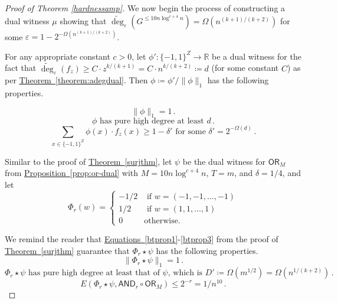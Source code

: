 \documentclass[11pt]{article}
\numberwithin{equation}{section}
\theoremstyle{definition}
\theoremstyle{plain}
\newcommand{\R}{\mathbb R}
\newcommand{\expref}[2]{\hyperref[#2]{#1~\ref{#2}}}
\newcommand{\expeqref}[2]{\hyperref[#2]{#1~\eqref{#2}}}
\newcommand{\OR}{\mathsf{ OR}}
\newcommand{\bits}{\{-1,1\}}
\newcommand{\ls}{\star}
\newcommand{\eps}{\varepsilon}
\newcommand{\adeg}{\widetilde{\operatorname{deg}}}
\newcommand{\AND}{\mathsf{AND}}
\begin{document}
\begin{proof}[Proof of Theorem \ref{hardnessamp}]
	
	\medskip
	We now begin the process of constructing a dual witness $\mu$ showing that $\adeg_{\eps}(G^{\leq 10 n \log^{c + 4} n})=\Omega\left(n^{(k+1)/(k+2)}\right)$
	for some $\eps=1-2^{-\Omega\left(n^{(k+1)/(k+2)}\right)}$.
	
	For any appropriate constant $c > 0$, let $\phi' \colon \bits^Z \to \R$ be a dual witness for the fact that $\adeg_{\eps}(f_z) \geq C \cdot z^{k/(k+1)} = C \cdot n^{k/(k+2)}\coloneqq d$ (for some constant $C$) as per \expref{Theorem}{theorem:adegdual}.
	Then $\phi \coloneqq  \phi'/\|\phi\|_1$ has the following properties. %
	
	\begin{equation}
	\label{phiprop1}
	\|\phi\|_1 =1\,.
	\end{equation}
	\begin{equation}
	\label{phiprop2}
	\phi \text{ has pure high degree at least } d\,.
	\end{equation}
	\begin{equation}
	\label{phiprop3}
	\sum_{x\in\bits^Z} \phi(x) \cdot f_z(x) \geq 1-\delta' \text{ for some } \delta'=2^{-\Omega(d)}\,.
	\end{equation}
	
	Similar to the proof of \expref{Theorem}{surjthm}, let $\psi$ be the dual witness for $\OR_M$ from \expref{Proposition}{prop:or-dual} with $M=10n\log^{c+4}n$, $T = m$, and $\delta=1/4$,
	and let 
	$$\Phi_r(w) = \begin{cases}
	-1/2 & \text{ if } w=(-1, -1, \dots, -1)\\
	1/2 & \text{ if } w= (1, 1, \dots, 1)\\
	0 & \text{otherwise}.
	\end{cases}$$
	
	We remind the reader %
	that \expeqref{Equations}{btprop1}-\eqref{btprop3} from the proof of \expref{Theorem}{surjthm} guarantee %
	 that $\Phi_r \ls \psi$ has
	the following properties.
	\begin{equation}  \label{btprop1repeat}
	\|\Phi_r \ls \psi\|_1=1\,.
	\end{equation}
	\begin{equation}  \label{btprop2repeat}
	\Phi_r \ls \psi \text{ has pure high degree at least that of } \psi \text{, which is } D'\coloneqq \Omega\left(m^{1/2}\right)=\Omega\left(n^{1/(k+2)}\right)\,.
	\end{equation}
	\begin{equation}  \label{btprop3repeat}
	E\left(\Phi_r \ls \psi, \AND_r \circ \OR_M\right) \leq 2^{-r}=1/n^{10}\,.
	\end{equation}


\end{proof}
\end{document}
